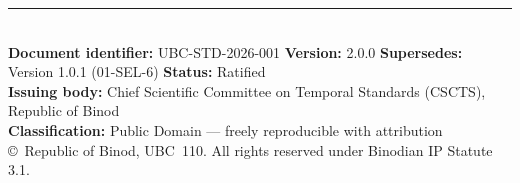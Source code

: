 \documentclass[journal,twoside]{IEEEtran}
\begin{document}
\vfill
\noindent\rule{\columnwidth}{0.4pt}\\[2pt]
{\footnotesize
\textbf{Document identifier:} UBC-STD-2026-001 \quad
\textbf{Version:} 2.0.0 \quad
\textbf{Supersedes:} Version 1.0.1 (01-SEL-6) \quad
\textbf{Status:} Ratified \\
\textbf{Issuing body:} Chief Scientific Committee on Temporal Standards (CSCTS),
Republic of Binod \\
\textbf{Classification:} Public Domain --- freely reproducible with attribution \\
\copyright~Republic of Binod, UBC~110.  All rights reserved under Binodian IP Statute 3.1.
}
\end{document}
